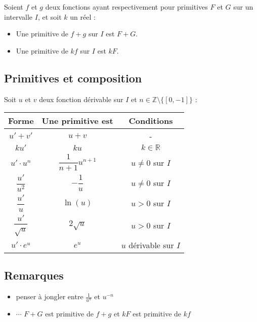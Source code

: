 \documentclass{report}
\begin{document}
      Soient $f$ et $g$ deux fonctions ayant respectivement pour primitives $F$ et $G$ sur un intervalle $I$, et soit $k$ un réel :
      \begin{itemize}
        \item Une primitive de $f + g$ sur $I$ est $F + G$.
        \item Une primitive de $k f$ sur $I$ est $k F$.
      \end{itemize}\fi

      \subsection{Primitives et composition}

        Soit $u$ et $v$ deux fonction dérivable sur $I$ et $n \in \mathbb{Z} \setminus \{[0, -1]\}$ :

        \begin{center}
          \renewcommand{\arraystretch}{2.25}
          \begin{tabular}{|c|c|c|}
            \hline
            \textbf{Forme} & \textbf{Une primitive est} & \textbf{Conditions} \\
            \hline
            $u' + v'$ & $u + v$ & - \\
            \hline
            $ku'$ & $ku$ & $k\in\mathbb{R}$ \\
            \hline
            $u' \cdot u^n$ 
            & $\dfrac{1}{n+1} u^{n+1}$ 
            & $u \ne 0$ sur $I$\\%
            \hline
            $\dfrac{u'}{u^2}$ & $- \dfrac{1}{u}$ & $u \ne 0$ sur $I$ \\
            \hline
            $\dfrac{u'}{u}$ & $\ln(u)$ & $u > 0$ sur $I$ \\
            \hline
            $\dfrac{u'}{\sqrt{u}}$ & $2 \sqrt{u}$ & $u > 0$ sur $I$ \\
            \hline
            $u' \cdot e^u$ & $e^u$ & $u$ dérivable sur $I$ \\
            \hline
          \end{tabular}
        \end{center}

      \subsection{Remarques}

        \begin{itemize}
          \item penser à jongler entre $\frac{1}{u^n}$ et $u^{-n}$
          \item $\cdots$ $F+G$ est primitive de $f+g$ et $kF$ est primitive de $kf$
        \end{itemize}
\end{document}
